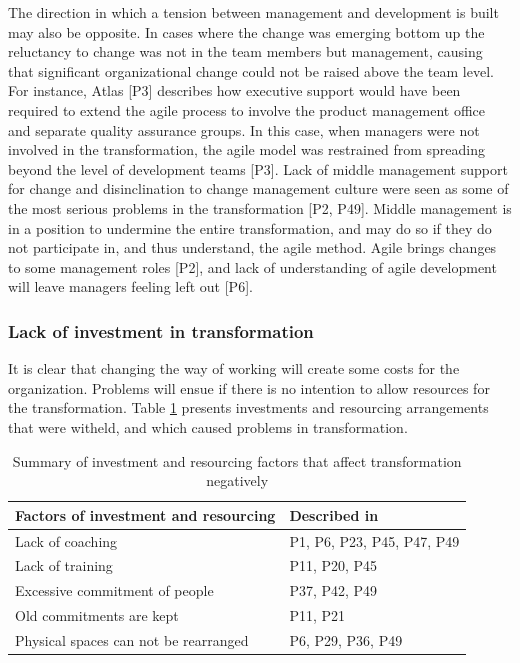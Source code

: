 \documentclass[preprint,authoryear,12pt]{elsarticle}
\begin{document}
The direction in which a tension between management and development is built may
also be opposite. In cases where the change was emerging bottom up the
reluctancy to change was not in the team members but management, causing that
significant organizational change could not be raised above the team level. For
instance, Atlas [P3] describes how executive support would have been required to
extend the agile process to involve the product management office and separate
quality assurance groups. In this case, when managers %
were not involved in the transformation, the agile model was restrained from
spreading beyond the level of development teams [P3]. Lack of middle management
support for change and disinclination to change management culture were seen as
some of the most serious problems in the transformation [P2, P49]. Middle
management is in a position to undermine the entire transformation, and may do
so if they do not participate in, and thus understand, the agile method. Agile
brings changes to some management roles [P2], and lack of understanding of agile
development will leave managers feeling left out [P6].


\subsubsection{Lack of investment in transformation}

It is clear that changing the way of working will create some costs for the
organization. Problems will ensue if there is no intention to allow resources
for the transformation. Table \ref{table:challenges_lackofinvestment} presents
investments and resourcing arrangements that were witheld, and which caused
problems in transformation.

\begin{table}[b]
    \begin{tabular}{ l l }
        \toprule
        Factors of investment and resourcing  &  Described in \\
        \midrule
        Lack of coaching                      &  P1, P6, P23, P45, P47, P49  \\
        Lack of training                      &  P11, P20, P45  \\
        Excessive commitment of people        &  P37, P42, P49  \\
        Old commitments are kept              &  P11, P21  \\
        Physical spaces can not be rearranged  &  P6, P29, P36, P49  \\
        \bottomrule
    \end{tabular}
    \caption{Summary of investment and resourcing factors that affect
             transformation negatively}
    \label{table:challenges_lackofinvestment}
\end{table}
\end{document}
